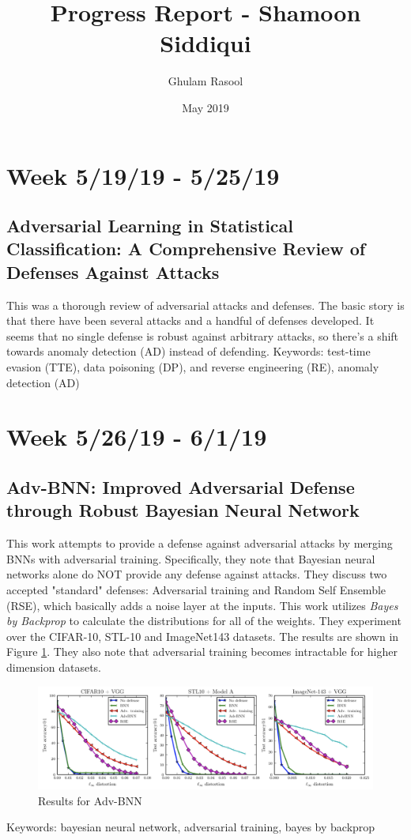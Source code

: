 \documentclass{article}
\title{Progress Report - Shamoon Siddiqui}
\author{Ghulam Rasool}
\date{May 2019}
\begin{document}
\maketitle

\section*{Week 5/19/19 - 5/25/19}

\subsection*{Adversarial Learning in Statistical Classification: A
Comprehensive Review of Defenses Against Attacks\citep{miller2019adversarial}}

This was a thorough review of adversarial attacks and defenses. The basic story is that there have been several attacks and a handful of defenses developed. It seems that no single defense is robust against arbitrary attacks, so there's a shift towards anomaly detection (AD) instead of defending.
\newline\newline
Keywords: test-time evasion (TTE), data poisoning (DP), and reverse engineering (RE), anomaly detection (AD)

\section*{Week 5/26/19 - 6/1/19}
\subsection*{Adv-BNN: Improved Adversarial Defense through Robust Bayesian Neural Network\cite{liu2018adv}}

This work attempts to provide a defense against adversarial attacks by merging BNNs with adversarial training. Specifically, they note that Bayesian neural networks alone do NOT provide any defense against attacks. They discuss two accepted "standard" defenses: Adversarial training and Random Self Ensemble (RSE), which basically adds a noise layer at the inputs. This work utilizes \textit{Bayes by Backprop} to calculate the distributions for all of the weights. They experiment over the CIFAR-10, STL-10 and ImageNet143 datasets. The results are shown in Figure \ref{figure1}. They also note that adversarial training becomes intractable for higher dimension datasets.
\begin{figure}
    \centering
    \includegraphics[width=1.0\textwidth]{results.png}
    \caption{Results for Adv-BNN}
    \label{figure1}
\end{figure}
\newline\newline
Keywords: bayesian neural network, adversarial training, bayes by backprop
\end{document}
